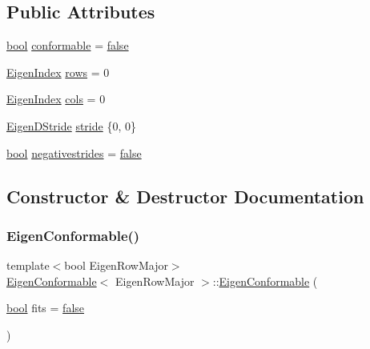 \subsection*{Public Attributes}
\begin{DoxyCompactItemize}
\item 
\mbox{\hyperlink{asdl_8h_af6a258d8f3ee5206d682d799316314b1}{bool}} \mbox{\hyperlink{struct_eigen_conformable_a0350af318be37c2422635571601e238f}{conformable}} = \mbox{\hyperlink{asdl_8h_af6a258d8f3ee5206d682d799316314b1ae9de385ef6fe9bf3360d1038396b884c}{false}}
\item 
\mbox{\hyperlink{eigen_8h_a4e595ab182718d84a409dd05e0829bdd}{Eigen\+Index}} \mbox{\hyperlink{struct_eigen_conformable_a3f4cea0fad3c49cfa1e543d7388af7be}{rows}} = 0
\item 
\mbox{\hyperlink{eigen_8h_a4e595ab182718d84a409dd05e0829bdd}{Eigen\+Index}} \mbox{\hyperlink{struct_eigen_conformable_a91d8590cd3f680d5c142367dc12f6ddd}{cols}} = 0
\item 
\mbox{\hyperlink{eigen_8h_a509c0a3fae790584bf0cfcccef41c784}{Eigen\+D\+Stride}} \mbox{\hyperlink{struct_eigen_conformable_a956848cb9f7abf1a2e6e31516c362360}{stride}} \{0, 0\}
\item 
\mbox{\hyperlink{asdl_8h_af6a258d8f3ee5206d682d799316314b1}{bool}} \mbox{\hyperlink{struct_eigen_conformable_aa5b13a64eb1b8a64f4b7778315e44f21}{negativestrides}} = \mbox{\hyperlink{asdl_8h_af6a258d8f3ee5206d682d799316314b1ae9de385ef6fe9bf3360d1038396b884c}{false}}
\end{DoxyCompactItemize}


\subsection{Constructor \& Destructor Documentation}
\mbox{\label{struct_eigen_conformable_a1061925396248cab26b777a4a5f17fc2}} 
\subsubsection{\texorpdfstring{EigenConformable()}{EigenConformable()}\hspace{0.1cm}{\footnotesize\ttfamily [1/3]}}
{\footnotesize\ttfamily template$<$bool Eigen\+Row\+Major$>$ \\
\mbox{\hyperlink{struct_eigen_conformable}{Eigen\+Conformable}}$<$ Eigen\+Row\+Major $>$\+::\mbox{\hyperlink{struct_eigen_conformable}{Eigen\+Conformable}} (\begin{DoxyParamCaption}\item[{\mbox{\hyperlink{asdl_8h_af6a258d8f3ee5206d682d799316314b1}{bool}}}]{fits = {\ttfamily \mbox{\hyperlink{asdl_8h_af6a258d8f3ee5206d682d799316314b1ae9de385ef6fe9bf3360d1038396b884c}{false}}} }\end{DoxyParamCaption})\hspace{0.3cm}{\ttfamily [inline]}}

